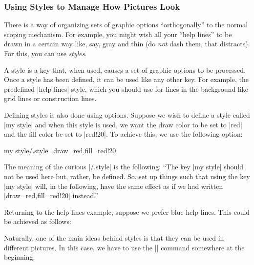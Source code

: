 \subsubsection{Using Styles to Manage How Pictures Look}

There is a way of organizing sets of graphic options ``orthogonally''
to the normal scoping mechanism. For example, you might wish all your
``help lines'' to be drawn in a certain way like, say, gray and thin
(do \emph{not} dash them, that distracts). For this, you can use
\emph{styles}.

A style is a key that, when used, causes a set of graphic options to
be processed. Once a style has been defined, it can be used like any
other key. For example, the predefined |help lines| style, which you
should use for lines in the background like grid lines or construction
lines.
\begin{codeexample}[]
\end{codeexample}

Defining styles is also done using options. Suppose we wish to define
a style called |my style| and when this style is used, we want the
draw color to be set to |red| and the fill color be set to
|red!20|. To achieve this, we use the following option:
\begin{codeexample}
my style/.style={draw=red,fill=red!20}
\end{codeexample}

The meaning of the curious |/.style| is the following: ``The key
|my style| should not be used here but, rather, be defined. So, set up
things such that using the key |my style| will, in the following, have
the same effect as if we had written |draw=red,fill=red!20| instead.''

Returning to the help lines example, suppose we prefer blue help
lines. This could be achieved as follows:
\begin{codeexample}[]
\end{codeexample}

Naturally, one of the main ideas behind styles is that they can be
used in different pictures. In this case, we have to use the
|\tikzset| command somewhere at the beginning.
\begin{codeexample}[]
\end{codeexample}

